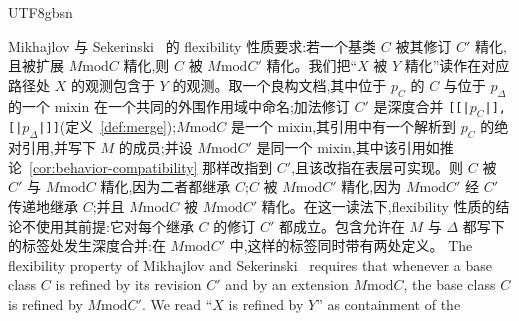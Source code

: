 \begin{CJK*}{UTF8}{gbsn}
\begin{corollary}\label{cor:fragile-base-class}
\ifPaperChinese
Mikhajlov 与 Sekerinski~\cite{mikhajlov1998-fragile-base-class} 的 flexibility 性质要求:若一个基类 $C$ 被其修订 $C'$ 精化,且被扩展 $M \mathbin{\mathrm{mod}} C$ 精化,则 $C$ 被 $M \mathbin{\mathrm{mod}} C'$ 精化。我们把``$X$ 被 $Y$ 精化''读作在对应路径处 $X$ 的观测包含于 $Y$ 的观测。取一个良构文档,其中位于 $p_C$ 的 $C$ 与位于 $p_\Delta$ 的一个 mixin 在一个共同的外围作用域中命名;加法修订 $C'$ 是深度合并 \texttt{[[|$p_C$|], [|$p_\Delta$|]]}(定义~\ref{def:merge});$M \mathbin{\mathrm{mod}} C$ 是一个 mixin,其引用中有一个解析到 $p_C$ 的绝对引用,并写下 $M$ 的成员;并设 $M \mathbin{\mathrm{mod}} C'$ 是同一个 mixin,其中该引用如推论~\ref{cor:behavior-compatibility} 那样改指到 $C'$,且该改指在表层可实现。则 $C$ 被 $C'$ 与 $M \mathbin{\mathrm{mod}} C$ 精化,因为二者都继承 $C$;$C$ 被 $M \mathbin{\mathrm{mod}} C'$ 精化,因为 $M \mathbin{\mathrm{mod}} C'$ 经 $C'$ 传递地继承 $C$;并且 $M \mathbin{\mathrm{mod}} C$ 被 $M \mathbin{\mathrm{mod}} C'$ 精化。在这一读法下,flexibility 性质的结论不使用其前提:它对每个继承 $C$ 的修订 $C'$ 都成立。包含允许在 $M$ 与 $\Delta$ 都写下的标签处发生深度合并:在 $M \mathbin{\mathrm{mod}} C'$ 中,这样的标签同时带有两处定义。
\else
The flexibility property of Mikhajlov and Sekerinski~\cite{mikhajlov1998-fragile-base-class} requires
that whenever a base class $C$ is refined by its revision $C'$ and by an extension $M \mathbin{\mathrm{mod}} C$, the base
class $C$ is refined by $M \mathbin{\mathrm{mod}} C'$. We read ``$X$ is refined by $Y$'' as containment of the

\end{corollary}
\end{CJK*}

